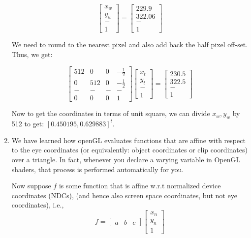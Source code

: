 \documentclass[letterpaper, 11pt]{article}
\begin{document}
\begin{enumerate}
{\begin{minipage}{6in}
\[
    \left[ \begin{array}{c}
        x_w \\ y_w \\ - \\ 1
    \end{array}\right]
    =
    \left[\begin{array}{c}
        229.9 \\ 322.06 \\ - \\ 1
    \end{array}\right]
\]

We need to round to the nearest pixel and also add back the half pixel off-set. Thus, we get:

\[
    \left[ \begin{array}{cccc} 
        512 & 0 & 0 & -\frac{1}{2}\\ 
        0 & 512 & 0 & -\frac{1}{2}\\
        - & - & - & -\\
        0 & 0 & 0 & 1
    \end{array}\right]
    \left[ \begin{array}{c}
        x_t \\ y_t \\ - \\ 1
    \end{array}\right]
    =
    \left[\begin{array}{c}
        230.5 \\ 322.5 \\ - \\ 1
    \end{array}\right]
\]

Now to get the coordinates in terms of unit square, we can divide $x_w, y_w$ by 512 to get: $[0.450195, 0.629883]^t$.
\end{minipage}
}

\item{}
  We have learned how openGL evaluates
  functions that are affine with
  respect to the eye coordinates (or equivalently: object coordinates or clip
  coordinates) over a triangle. In fact, whenever you declare a varying
  variable in OpenGL shaders, that process is performed automatically
  for you.

  Now suppose $f$ is some function that is 
 affine w.r.t normalized device
  coordinates (NDCs), (and hence also screen space coordinates, but not
  eye coordinates), i.e.,
$$
f = \left[\begin{array}{ccc} a & b & c \end{array}\right] \left[\begin{array}{c}
x_n\\
y_n\\
1
\end{array}\right]
$$


\end{enumerate}
\end{document}
